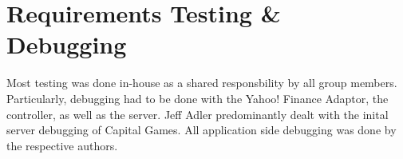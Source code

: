 \chapter{Requirements Testing \& Debugging}

Most testing was done in-house as a shared responsbility by all group members. Particularly, debugging had to be done with the Yahoo! Finance Adaptor, the controller, as well as the server. Jeff Adler predominantly dealt with the inital server debugging of Capital Games. All application side debugging was done by the respective authors.
